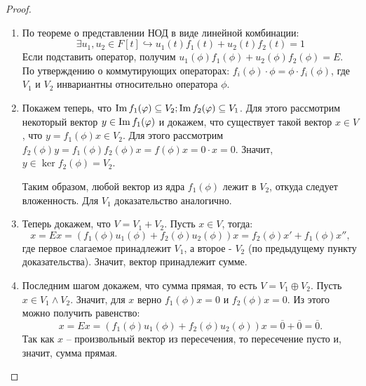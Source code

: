 \begin{proof}~
    \begin{enumerate}
        \item По теореме о представлении НОД в виде линейной комбинации: 
            $$\exists u_1, u_2 \in F[t] \hookrightarrow u_1(t)f_1(t) + u_2(t)f_2(t) = 1$$ 
            Если подставить оператор, получим $u_1(\phi)f_1(\phi) + u_2(\phi)f_2(\phi) = E$. \\
            По утверждению о коммутирующих операторах: $f_i(\phi) \cdot \phi = \phi \cdot f_i(\phi)$, 
            где $V_1$ и $V_2$ инвариантны относительно оператора $\phi$.
        \item Покажем теперь, что $\operatorname{Im} f_1(\varphi) \subseteq V_2; \operatorname{Im} f_2(\varphi) \subseteq V_1$. 
            Для этого рассмотрим некоторый вектор $y \in \operatorname{Im} f_1(\varphi)$ и докажем, 
            что существует такой вектор $x \in V$, что $y = f_1(\phi) x \in V_2$. 
            Для этого рассмотрим $f_2(\phi) y = f_1(\phi) f_2(\phi) x = f(\phi) x = 0 \cdot x = 0$. 
            Значит, $y \in \ker f_2(\phi) = V_2$. 
            
            Таким образом, любой вектор из ядра $f_1(\phi)$ 
            лежит в $V_2$, откуда следует вложенность. Для $V_1$ доказательство аналогично.
        \item Теперь докажем, что $V = V_1 + V_2$. Пусть $x \in V$, тогда:
            $$x = Ex = (f_1(\phi)u_1(\phi) + f_2(\phi)u_2(\phi)) x = f_2(\phi) x' + f_1(\phi) x'',$$ 
            где первое слагаемое принадлежит $V_1$, а второе - $V_2$ 
            (по предыдущему пункту доказательства). Значит, вектор принадлежит сумме.
        \item Последним шагом докажем, что сумма прямая, то есть $V = V_1 \oplus V_2$. 
            Пусть $x \in V_1 \land V_2$. Значит, для $x$ верно $f_1(\phi) x = 0$ и $f_2(\phi) x = 0$. 
            Из этого можно получить равенство:
            $$x = Ex = (f_1(\phi)u_1(\phi) + f_2(\phi)u_2(\phi)) x = \overline{0} + \overline{0} = \overline{0}.$$ 
            Так как $x$ -- произвольный вектор из пересечения, то пересечение пусто и, значит, сумма прямая.
    \end{enumerate}
\end{proof}
